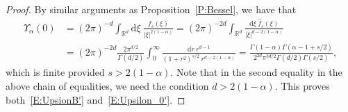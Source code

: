 \documentclass[sn-mathphys]{sn-jnl}%
\renewcommand{\R}{\mathbb{R}}
\newcommand{\ud}{\ensuremath{\mathrm{d}}}
\numberwithin{equation}{section}
\theoremstyle{thmstyleone}%
\theoremstyle{thmstyletwo}%
\theoremstyle{thmstylethree}%
\begin{document}
\begin{proof}
  By similar arguments as Proposition~\ref{P:Bessel}, we have that
	\begin{align*}
     \Upsilon_{\alpha}(0)
     & = (2\pi)^{-d}  \int_{\R^d} \ud\xi\: \frac{f_s(\xi)}{\lvert\xi\rvert^{2(1-\alpha)}}
       = (2\pi)^{-2d} \int_{\R^d} \frac{\ud \xi \: \widehat{f}_s(\xi)}{\lvert\xi\rvert^{d-2(1-\alpha)}} \\
     & = (2\pi)^{-2d} \frac{2 \pi^{d/2}}{\Gamma\left(d/2\right)} \int_0^\infty \frac{\ud r\: r^{d-1}}{ \left(1+r^2\right)^{s / 2} \: r^{d - 2(1-\alpha)}}
       = \frac{\Gamma\left(1 - \alpha\right) \Gamma\left(\alpha - 1 + s/2\right)}{2^{2d} \pi^{3d/2} \Gamma(d/2)\Gamma\left(s/2\right) },
	\end{align*}
  which is finite provided $s>2(1-\alpha)$. Note that in the second equality in the above chain of
  equalities, we need the condition $d>2(1-\alpha)$. This proves both~\eqref{E:UpsionB'}
  and~\eqref{E:Upsilon_0'}.


\end{proof}
\end{document}
